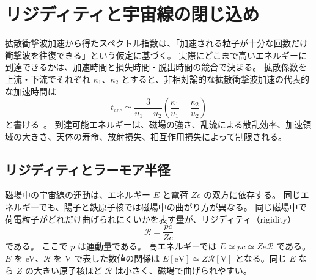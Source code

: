 \documentclass[book,paper=a4,fontsize=11pt]{jlreq}
\begin{document}
\section{リジディティと宇宙線の閉じ込め}
拡散衝撃波加速から得たスペクトル指数は、「加速される粒子が十分な回数だけ衝撃波を往復できる」という仮定に基づく。
実際にどこまで高いエネルギーに到達できるかは、加速時間と損失時間・脱出時間の競合で決まる。
拡散係数を上流・下流でそれぞれ \(\kappa_1\)、\(\kappa_2\) とすると、非相対論的な拡散衝撃波加速の代表的な加速時間は
\begin{equation}
  t_{\mathrm{acc}}
  \simeq
  \frac{3}{u_1-u_2}
  \left(
    \frac{\kappa_1}{u_1}
    +
    \frac{\kappa_2}{u_2}
  \right)
\end{equation}
と書ける~\cite{Drury1983}。
到達可能エネルギーは、磁場の強さ、乱流による散乱効率、加速領域の大きさ、天体の寿命、放射損失、相互作用損失によって制限される。

\subsection{リジディティとラーモア半径}\label{subsec:rigidity_larmor}
磁場中の宇宙線の運動は、エネルギー \(E\) と電荷 \(Ze\) の双方に依存する。
同じエネルギーでも、陽子と鉄原子核では磁場中の曲がり方が異なる。
同じ磁場中で荷電粒子がどれだけ曲げられにくいかを表す量が、リジディティ（rigidity）
\begin{equation}
  \mathcal{R}=\frac{pc}{Ze}
\end{equation}
である。
ここで \(p\) は運動量である。
高エネルギーでは \(E\simeq pc\simeq Ze\mathcal R\) である。\(E\) を eV、\(\mathcal R\) を V で表した数値の関係は \(E[\mathrm{eV}]\simeq Z\mathcal R[\mathrm V]\) となる。同じ \(E\) なら \(Z\) の大きい原子核ほど \(\mathcal{R}\) は小さく、磁場で曲げられやすい。
\end{document}
